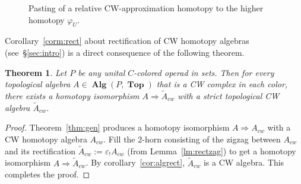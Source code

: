 \documentclass{amsart}
\newtheorem{theorem}[formula]{Theorem}
\theoremstyle{definition}
\theoremstyle{remark}
\newcommand{\eps}{\varepsilon}
\DeclareMathOperator{\Top}{\mathbf{Top}}
\DeclareMathOperator{\Alg}{\mathbf{Alg}}
\renewcommand{\phi}{\varphi}
\begin{document}
	\begin{figure}
		\centering
		\begin{minipage}[t]{0.1\textwidth}
			\centering
		\end{minipage}
		\begin{minipage}[t]{0.1\textwidth}
			\centering
		\end{minipage}
		\begin{minipage}[t]{0.1\textwidth}
			\centering
		\end{minipage}
		\caption{Pasting of a relative CW-approximation homotopy to the higher homotopy $\phi_{U}$.
		}\label{fig:hompas}
	\end{figure}
	
	Corollary~\ref{corm:rect} about rectification of CW homotopy algebras (see~\S\ref{sec:intro}) is a direct consequence of the following theorem.
	
	\begin{theorem}\label{thm:cwapp}
		Let $P$ be any unital $C$-colored operad in sets.
		Then for every topological algebra $A\in \Alg(P,\Top)$ that is a CW complex in each color, there exists a homotopy isomorphism $A\Rightarrow \widetilde{A}_{cw}$ with a strict topological CW algebra $\widetilde{A}_{cw}$.
	\end{theorem}
	\begin{proof}
		Theorem~\ref{thm:gen} produces a homotopy isomorphism $A\Rightarrow A_{cw}$ with a CW homotopy algebra $A_{cw}$.
		Fill the $2$-horn consisting of the zigzag between $A_{cw}$ and its rectification $\widetilde{A}_{cw}:=\eps_{!} A_{cw}$ (from Lemma~\ref{lm:rectzag}) to get a homotopy isomorphism $A\Rightarrow \widetilde{A}_{cw}$.
		By corollary~\ref{cor:algrect}, $\widetilde{A}_{cw}$ is a CW algebra.
		This completes the proof.
	\end{proof}
	
\end{document}
